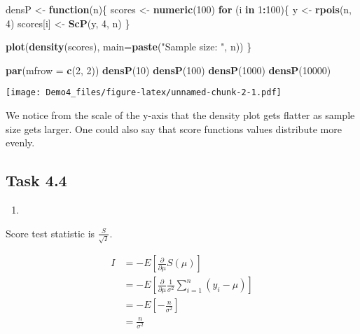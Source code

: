 \documentclass[
]{article}
\newenvironment{Shaded}{\begin{snugshade}}{\end{snugshade}}
\newcommand{\AttributeTok}[1]{\textcolor[rgb]{0.13,0.29,0.53}{#1}}
\newcommand{\ControlFlowTok}[1]{\textcolor[rgb]{0.13,0.29,0.53}{\textbf{#1}}}
\newcommand{\DecValTok}[1]{\textcolor[rgb]{0.00,0.00,0.81}{#1}}
\newcommand{\FunctionTok}[1]{\textcolor[rgb]{0.13,0.29,0.53}{\textbf{#1}}}
\newcommand{\NormalTok}[1]{#1}
\newcommand{\OtherTok}[1]{\textcolor[rgb]{0.56,0.35,0.01}{#1}}
\newcommand{\SpecialCharTok}[1]{\textcolor[rgb]{0.81,0.36,0.00}{\textbf{#1}}}
\newcommand{\StringTok}[1]{\textcolor[rgb]{0.31,0.60,0.02}{#1}}
\providecommand{\tightlist}{%
  \setlength{\itemsep}{0pt}\setlength{\parskip}{0pt}}
\begin{document}
\begin{Shaded}
\begin{Highlighting}[]
\NormalTok{densP }\OtherTok{\textless{}{-}} \ControlFlowTok{function}\NormalTok{(n)\{}
\NormalTok{  scores }\OtherTok{\textless{}{-}} \FunctionTok{numeric}\NormalTok{(}\DecValTok{100}\NormalTok{)}
  \ControlFlowTok{for}\NormalTok{ (i }\ControlFlowTok{in} \DecValTok{1}\SpecialCharTok{:}\DecValTok{100}\NormalTok{)\{}
\NormalTok{    y }\OtherTok{\textless{}{-}} \FunctionTok{rpois}\NormalTok{(n, }\DecValTok{4}\NormalTok{)}
\NormalTok{    scores[i] }\OtherTok{\textless{}{-}} \FunctionTok{ScP}\NormalTok{(y, }\DecValTok{4}\NormalTok{, n)}
\NormalTok{  \}}
  
  \FunctionTok{plot}\NormalTok{(}\FunctionTok{density}\NormalTok{(scores), }\AttributeTok{main=}\FunctionTok{paste}\NormalTok{(}\StringTok{"Sample size: "}\NormalTok{, n))}
\NormalTok{\}}

\FunctionTok{par}\NormalTok{(}\AttributeTok{mfrow =} \FunctionTok{c}\NormalTok{(}\DecValTok{2}\NormalTok{, }\DecValTok{2}\NormalTok{))}
\FunctionTok{densP}\NormalTok{(}\DecValTok{10}\NormalTok{)}
\FunctionTok{densP}\NormalTok{(}\DecValTok{100}\NormalTok{)}
\FunctionTok{densP}\NormalTok{(}\DecValTok{1000}\NormalTok{)}
\FunctionTok{densP}\NormalTok{(}\DecValTok{10000}\NormalTok{)}
\end{Highlighting}
\end{Shaded}

\texttt{[image: Demo4\_files/figure-latex/unnamed-chunk-2-1.pdf]}

We notice from the scale of the y-axis that the density plot gets
flatter as sample size gets larger. One could also say that score
functions values distribute more evenly.

\hypertarget{task-4.4}{%
\subsection{Task 4.4}\label{task-4.4}}

\begin{enumerate}
\def\labelenumi{\alph{enumi})}
\tightlist
\item
\end{enumerate}

Score test statistic is \(\frac{S}{\sqrt{I}}\).

\begin{equation}
\begin{split}
I &= -E\left[ \frac{\partial}{\partial \mu} S(\mu)\right]\\
&= -E\left[ \frac{\partial}{\partial \mu} \frac{1}{\sigma^2} \sum_{i=1}^n (y_i - \mu)\right]\\
&= -E\left[ -\frac{n}{\sigma^2}\right]\\
&= \frac{n}{\sigma^2}
\end{split}
\end{equation}
\end{document}
